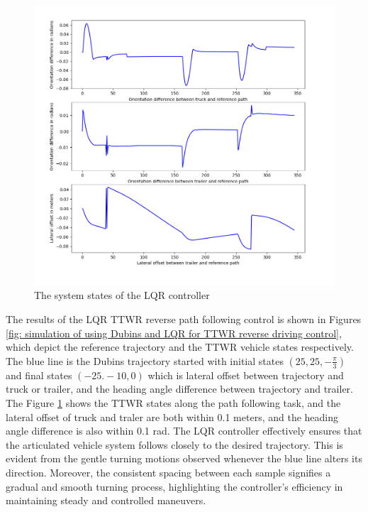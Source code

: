 \begin{figure}
    \centering
    \includegraphics[width=0.7\linewidth]{fig/lqr/lqr states.png}
    \caption{The system states of the LQR controller}
    \label{fig: system states of the LQR controller}
\end{figure}

The results of the LQR TTWR reverse path following control is shown in Figures \ref{fig: simulation of using Dubins and LQR for TTWR reverse driving control}, which depict the reference trajectory and the TTWR vehicle states respectively. The blue line is the Dubins trajectory started with initial states $(25, 25, -\frac{\pi}{3})$ and final states $(-25. -10, 0)$ which is lateral offset between trajectory and truck or trailer, and the heading angle difference between trajectory and trailer. The Figure \ref{fig: system states of the LQR controller} shows the TTWR states along the path following task, and the lateral offset of truck and traler are both within 0.1 meters, and the heading angle difference is also within 0.1 rad. The LQR controller effectively ensures that the articulated vehicle system follows closely to the desired trajectory. This is evident from the gentle turning motions observed whenever the blue line alters its direction. Moreover, the consistent spacing between each sample signifies a gradual and smooth turning process, highlighting the controller's efficiency in maintaining steady and controlled maneuvers.

\clearpage

